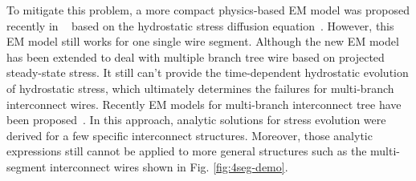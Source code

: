 To mitigate this problem, a more compact physics-based EM model was
proposed recently in ~\cite{HuangYu:DAC'14} based on the hydrostatic
stress diffusion equation~\cite{Korhonen:jap1993}. However, this EM
model still works for one single wire segment. Although the new EM
model has been extended to deal with multiple branch tree wire based
on projected steady-state stress.  It still can't provide the
time-dependent hydrostatic evolution of hydrostatic stress, which
ultimately determines the failures for multi-branch interconnect
wires.  Recently EM models for multi-branch interconnect tree have
been proposed~\cite{ChenHuang:DAC'15,ChenTan:TCAD'16}. In this
approach, analytic solutions for stress evolution were derived for a
few specific interconnect structures. Moreover, those analytic
expressions still cannot be applied to more general structures
such as the multi-segment interconnect wires shown in
Fig. \ref{fig:4seg-demo}.




